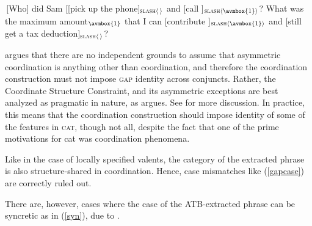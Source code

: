 \documentclass[output=paper]{langsci/langscibook}
\begin{document}
\begin{exe}
\ex \begin{xlista}
\ex \,[Who] did Sam [[pick up the phone]$_{\textup{\textsc{slash}} \langle \, \rangle}$ and [call \spc]$_{\textup{\textsc{slash}} \langle \avmbox{1} \rangle}$?
\ex What was the maximum amount$_{\avmbox{1}}$ that
I can [contribute \spc]$_{\textup{\textsc{slash}} \langle \avmbox{1} \rangle}$ and [still get a tax deduction]$_{\textup{\textsc{slash}} \langle \, \rangle}$?
\end{xlista}\label{assym}
\end{exe}


\citet{chavesextr} argues that there are no independent grounds to assume that asymmetric coordination is anything other than coordination, and therefore the coordination construction must not impose \textsc{gap} identity across conjuncts. Rather, the Coordinate Structure Constraint, and its asymmetric exceptions are best analyzed as
pragmatic in nature, as \citet{kehler} argues. 
See  for more discussion.
In practice, this means that the coordination construction should impose identity of some of the features in \textsc{cat}, though not all, despite the fact that one of the prime motivations for {\sc cat} was
coordination phenomena.

Like in the case of locally specified valents, the category of the extracted phrase is also structure-shared
in coordination. Hence, case mismatches like (\ref{gapcase}) are
correctly ruled out.


\begin{exe}
\ex
\begin{xlista}
\end{xlista}\label{gapcase}
\end{exe}

\noindent
There are, however, cases where the case of the ATB-extracted phrase can be syncretic as in (\ref{syn}), 
due to \citet{levineetal}. 

\begin{exe}
\ex
\begin{xlista}

\end{xlista}\label{syn}
\end{exe}
\end{document}

